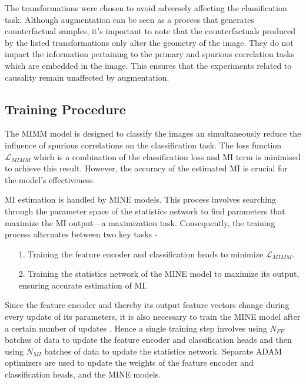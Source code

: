 \documentclass[12pt,DIV14,BCOR12mm,a4paper,footinclude=false,headinclude,parskip=half-,twoside,openright,cleardoublepage=empty,toc=index,bibliography=totoc,listof=totoc]{scrreprt}
\numberwithin{equation}{chapter}
\begin{document}
The transformations were chosen to avoid adversely affecting the classification task. Although augmentation can be seen as a process that generates counterfactual samples, it's important to note that the counterfactuals produced by the listed transformations only alter the geometry of the image. They do not impact the information pertaining to the primary and spurious correlation tasks which are embedded in the image. This ensures that the experiments related to causality remain unaffected by augmentation.

\subsection{Training Procedure}
The MIMM model is designed to classify the images an simultaneously reduce the influence of spurious correlations on the classification task. The loss function $\mathcal{L}_{MIMM}$ which is a combination of the classification loss and MI term is minimised to achieve this result. However, the accuracy of the estimated MI is crucial for the model's effectiveness.

MI estimation is handled by MINE models. This process involves searching through the parameter space of the statistics network to find parameters that maximize the MI output—a maximization task. Consequently, the training process alternates between two key tasks -

\begin{itemize}
    \item[1.] Training the feature encoder and classification heads to minimize $\mathcal{L}_{MIMM}$.
    \item[2.] Training the statistics network of the MINE model to maximize its output, ensuring accurate estimation of MI.
\end{itemize}

Since the feature encoder and thereby its output feature vectors change during every update of its parameters, it is also necessary to train the MINE model after a certain number of updates \cite{10162210}. Hence a single training step involves using $N_{FE}$ batches of data to update the feature encoder and classification heads and then using $N_{MI}$ batches of data to update the statistics network. Separate ADAM optimizers are used to update the weights of the feature encoder and classification heads, and the MINE models. 
\end{document}

